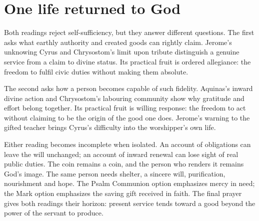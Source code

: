\section{One life returned to God}
Both readings reject self-sufficiency, but they answer different questions. The first asks what earthly authority and created goods can rightly claim. Jerome's unknowing Cyrus and Chrysostom's limit upon tribute distinguish a genuine service from a claim to divine status. Its practical fruit is ordered allegiance: the freedom to fulfil civic duties without making them absolute.

The second asks how a person becomes capable of such fidelity. Aquinas's inward divine action and Chrysostom's labouring community show why gratitude and effort belong together. Its practical fruit is willing response: the freedom to act without claiming to be the origin of the good one does. Jerome's warning to the gifted teacher brings Cyrus's difficulty into the worshipper's own life.

Either reading becomes incomplete when isolated. An account of obligations can leave the will unchanged; an account of inward renewal can lose sight of real public duties. The coin remains a coin, and the person who renders it remains God's image. The same person needs shelter, a sincere will, purification, nourishment and hope. The Psalm Communion option emphasizes mercy in need; the Mark option emphasizes the saving gift received in faith. The final prayer gives both readings their horizon: present service tends toward a good beyond the power of the servant to produce.
